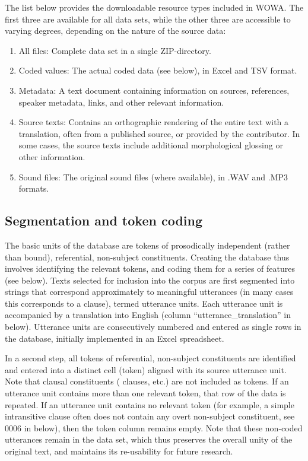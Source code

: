 \documentclass[output=paper,colorlinks,citecolor=brown,collectionchapter]{langscibook}
\begin{document}
The list below provides the downloadable resource types included in WOWA. The first three are available for all data sets, while the other three are accessible to varying degrees, depending on the nature of the source data:

\begin{enumerate}
\item All files: Complete data set in a single ZIP-directory.
\item Coded values: The actual coded data (see below), in Excel and TSV format.
\item Metadata: A text document containing information on sources, references, speaker metadata, links, and other relevant information.
\newpage
\item Source texts: Contains an orthographic rendering of the entire text with a translation, often from a published source, or provided by the contributor. In some cases, the source texts include additional morphological glossing or other information.
\item Sound files: The original sound files (where available), in .WAV and .MP3 formats.
\end{enumerate}

\subsection{Segmentation and token coding}\label{Intro:ss:3.2}

The basic units of the database are tokens of prosodically independent (rather than bound), referential, non-subject constituents. Creating the database thus involves identifying the relevant tokens, and coding them for a series of features (see below). Texts selected for inclusion into the corpus are first segmented into strings that correspond approximately to meaningful utterances (in many cases this corresponds to a clause), termed utterance units. Each utterance unit is accompanied by a translation into English (column ``utterance\_translation'' in  below). Utterance units are consecutively numbered and entered as single rows in the database, initially implemented in an Excel spreadsheet.

In a second step, all tokens of referential, non-subject constituents are identified and entered into a distinct cell (token) aligned with its source utterance unit. Note that clausal constituents ( clauses, etc.) are not included as tokens. If an utterance unit contains more than one relevant token, that row of the data is repeated. If an utterance unit contains no relevant token (for example, a simple intransitive clause often does not contain any overt non-subject constituent, see 0006 in  below), then the token column remains empty. Note that these non-coded utterances remain in the data set, which thus preserves the overall unity of the original text, and maintains its re-usability for future research.
\end{document}

